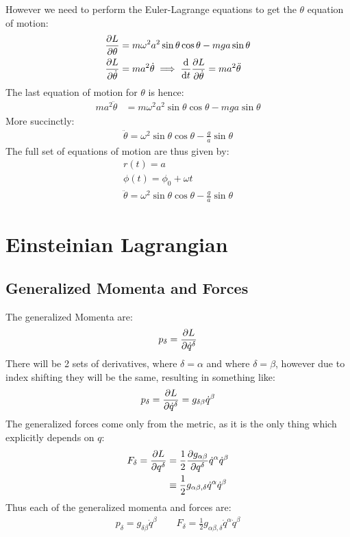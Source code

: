 \documentclass[12pt]{article}
\begin{document}
However we need to perform the Euler-Lagrange equations to get the $\theta$ equation of motion:
\begin{align*}
  \pdv{L}{\theta}&=m\omega^2a^2\sin\theta\cos\theta-mga\sin\theta\\
  \pdv{L}{\dot{\theta}}&=ma^2\dot{\theta}\implies
  \dv{t}\pdv{L}{\dot{\theta}}=ma^2\ddot{\theta}
\end{align*}
The last equation of motion for $\theta$ is hence:
\begin{align*}
  ma^2\ddot{\theta}&=m\omega^2a^2\sin\theta\cos\theta-mga\sin\theta
\end{align*}
More succinctly:
\begin{align*}
  \ddot{\theta}=\omega^2\sin\theta\cos\theta-\frac{g}{a}\sin\theta
\end{align*}
The full set of equations of motion are thus given by:
\begin{equation}
  \boxed{
    \begin{gathered}
      r(t)=a\\
      \phi(t)=\phi_0+\omega t\\
      \ddot{\theta}=\omega^2\sin\theta\cos\theta-\frac{g}{a}\sin\theta
    \end{gathered}
  }
\end{equation}
\newpage
\section{Einsteinian Lagrangian}
\subsection{Generalized Momenta and Forces}
The generalized Momenta are:
\begin{align*}
  p_\delta=\pdv{L}{\dot{q}^\delta}
\end{align*}
There will be 2 sets of derivatives, where $\delta=\alpha$ and where $\delta=\beta$, however due to index shifting they will be the same, resulting in something like:
\begin{align*}
  p_\delta=\pdv{L}{\dot{q}^\delta}=g_{\delta\beta}\dot{q}^\beta
\end{align*}
The generalized forces come only from the metric, as it is the only thing which explicitly depends on $q$:
\begin{align*}
  F_\delta=\pdv{L}{q^\delta}&=\frac12\pdv{g_{\alpha\beta}}{q^\delta}
  \dot{q}^\alpha\dot{q}^\beta\\
  &\equiv\frac12g_{\alpha\beta,\delta}\dot{q}^\alpha\dot{q}^\beta
\end{align*}
Thus each of the generalized momenta and forces are:
\begin{align}
  \boxed{
      p_\delta=g_{\delta\beta}\dot{q}^\beta\qquad
      F_\delta=\frac12g_{\alpha\beta,\delta}\dot{q}^\alpha\dot{q}^\beta
  }
\end{align}
\end{document}

